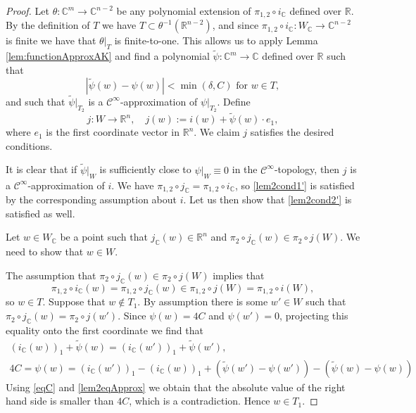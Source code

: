 \documentclass{amsart}
\theoremstyle{plain}
\theoremstyle{definition}
\theoremstyle{remark}
\numberwithin{equation}{thm} %
\newcommand{\R}{\mathbb{R}}
\newcommand{\C}{\mathbb{C}}
\begin{document}
\begin{proof}
Let $\theta:\C^m\rightarrow \C^{n-2}$ be any polynomial extension of $\pi_{1,2}\circ i_\C$ defined over $\R$. By the definition of $T$ we have $T\subset \theta^{-1}(\R^{n-2})$, and since $\pi_{1,2}\circ i_\C:W_\C\rightarrow \C^{n-2}$ is finite we have that $\theta\vert_T$ is finite-to-one. This allows us to apply Lemma \ref{lem:functionApproxAK} and find a polynomial $\tilde \psi:\C^m\rightarrow \C$ defined over $\R$ such that 
\begin{equation}\label{lem2eqApprox}
    |\tilde \psi(w)-\psi(w)|<\min(\delta,C)\text{ for }w\in T,
\end{equation}
and such that $\tilde \psi\vert_{T_2}$ is a $\mathcal C^\infty$-approximation of $\psi\vert_{T_2}$. Define
\begin{equation*}
    j:W\rightarrow \R^n, \quad j(w):=i(w)+\tilde \psi(w)\cdot e_1, 
\end{equation*}
where $e_1$ is the first coordinate vector in $\R^n$. We claim $j$ satisfies the desired conditions.

It is clear that if $\tilde \psi\vert_W$ is sufficiently close to $\psi\vert_W\equiv 0$ in the $\mathcal C^\infty$-topology, then $j$ is a $\mathcal C^\infty$-approximation of $i$. We have $\pi_{1,2}\circ j_\C=\pi_{1,2}\circ i_\C$, so \eqref{lem2cond1'} is satisfied by the corresponding assumption about $i$. Let us then show that \eqref{lem2cond2'} is satisfied as well.

Let $w\in W_\C$ be a point such that $j_\C(w)\in \R^n$ and $\pi_2\circ j_\C(w)\in \pi_2\circ j(W)$. We need to show that $w\in W$.
 
The assumption that $\pi_2\circ j_\C(w)\in \pi_2\circ j(W)$ implies that
\begin{equation*}
    \pi_{1,2}\circ i_\C(w)=\pi_{1,2}\circ j_\C(w)\in \pi_{1,2}\circ j(W)=\pi_{1,2}\circ i(W),
\end{equation*}
so $w\in T$. Suppose that $w\not\in T_1$. By assumption there is some $w'\in W$ such that $\pi_2\circ j_\C(w)= \pi_2\circ j(w')$. Since $\psi(w)=4C$ and $\psi(w')=0$, projecting this equality onto the first coordinate we find that
\begin{gather*}
    (i_\C(w))_1+\tilde \psi(w)=(i_\C(w'))_1+\tilde \psi(w'), \\
    4C=\psi(w)=(i_\C(w'))_1-(i_\C(w))_1+\left(\tilde \psi(w')-\psi(w')\right)-\left(\tilde \psi(w)-\psi(w)\right)
\end{gather*}
Using \eqref{eqC} and \eqref{lem2eqApprox} we obtain that the absolute value of the right hand side is smaller than $4C$, which is a contradiction. Hence $w\in T_1$.


\end{proof}
\end{document}
